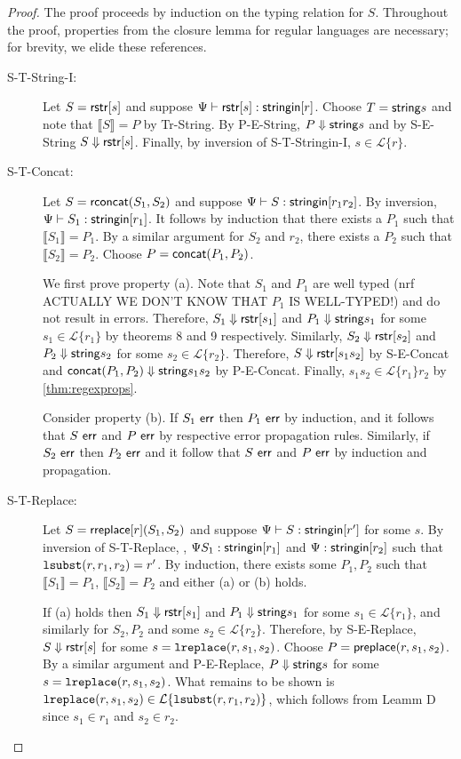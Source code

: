 \documentclass{acm_proc_article-sp}
\theoremstyle{definition}
\newcommand{\Lagr}{\mathcal{L}}
\newcommand{\lang}[1]{\Lagr\{#1\}}
\newcommand{\stringin}[1]{{\sf stringin}[#1]}
\newcommand{\preplace}[3]{{\sf preplace}(#1,#2,#3)}
\newcommand{\str}{{\sf string}}
\newcommand{\lsubst}[3]{{\tt lsubst}(#1,#2,#3)} %
\newcommand{\lreplace}[3]{{\tt lreplace}(#1, #2, #3)}
\newcommand{\err}{\ {\sf err}}
\newcommand{\trden}[1]{\llbracket #1 \rrbracket} %
\newcommand{\treduces}{ \Downarrow }
\newcommand{\sreduces}{ \Downarrow }
\begin{document}
\begin{proof}
The proof proceeds by induction on the typing relation for $S$.
Throughout the proof, properties from the closure lemma for regular languages
are necessary; for brevity, we elide these references.

\begin{description}
\item[S-T-String-I:] 
Let $S = {\sf rstr}[s]$ and suppose $\sctx \vdash \rstr{s} : \stringin{r}$.
Choose $T = \str{s}$ and note that $\trden{S} = P$ by Tr-String.
By P-E-String, $P \treduces \str{s}$ and by S-E-String $S \treduces \rstr{s}$.
Finally, by inversion of S-T-Stringin-I, $s \in \lang{r}$.

\item[S-T-Concat:]
Let $S = {\sf rconcat}(S_1,S_2)$ and suppose $\sctx \vdash S : \stringin{r_1 r_2}$.
By inversion, $\sctx \vdash S_1 : \stringin{r_1}$.
It follows by induction that there exists a $P_1$ such that $\trden{S_1} = P_1$.
By a similar argument for $S_2$ and $r_2$, there exists a $P_2$ such that $\trden{S_2} = P_2$.
Choose $P = {\sf concat}(P_1,P_2)$.

We first prove property (a).
Note that $S_1$ and $P_1$ are well typed (nrf ACTUALLY WE DON'T KNOW THAT $P_1$ IS WELL-TYPED!) and do not result in errors.
Therefore, $S_1 \sreduces \rstr{s_1}$ and $P_1 \treduces \str{s_1}$ for some $s_1 \in \lang{r_1}$ by theorems 8 and 9 respectively. %
Similarly, $S_2 \sreduces \rstr{s_2}$ and $P_2 \treduces \str{s_2}$ for some $s_2 \in \lang{r_2}$.
Therefore, $S \sreduces \rstr{s_1 s_2}$ by S-E-Concat and $\concat{P_1}{P_2} \treduces \str{s_1 s_2}$ by P-E-Concat.
Finally, $s_1s_2 \in \lang{r_1}{r_2}$ by \ref{thm:regexprops}.

Consider property (b).
If $S_1 \err$ then $P_1 \err$ by induction, and it follows that $S \err$ and $P \err$ by respective error propagation rules.
Similarly, if $S_2 \err$ then $P_2 \err$ and it follow that $S \err$ and $P \err$ by induction and propagation.

\item[S-T-Replace:]
Let $S = {\sf rreplace}[r](S_1,S_2)$ and suppose $\sctx \vdash S : \stringin{r'}$ for some $s$.
By inversion of S-T-Replace, , $\sctx S_1 : \stringin{r_1}$ and $\sctx : \stringin{r_2}$ 
such that $\lsubst{r}{r_1}{r_2} = r'$.
By induction, there exists some $P_1, P_2$ such that $\trden{S_1} = P_1$, $\trden{S_2} = P_2$
and either (a) or (b) holds.

If (a) holds then $S_1 \sreduces \rstr{s_1}$ and $P_1 \treduces \str{s_1}$ for some $s_1 \in \lang{r_1}$,
and similarly for $S_2, P_2$ and some $s_2 \in \lang{r_2}$.
Therefore, by S-E-Replace, $S \sreduces \rstr{s}$ for some $s = \lreplace{r}{s_1}{s_2}$.
Choose $P = \preplace{r}{s_1}{s_2}$.
By a similar argument and P-E-Replace, $P \treduces \str{s}$ for some $s = \lreplace{r}{s_1}{s_2}$.
What remains to be shown is $\lreplace{r}{s_1}{s_2} \in \lang{\lsubst{r}{r_1}{r_2}}$,
which follows from Leamm D since $s_1 \in r_1$ and $s_2 \in r_2$.


\end{description}
\end{proof}
\end{document}
